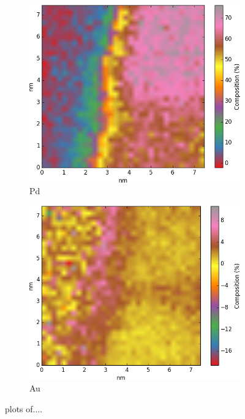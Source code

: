 \begin{figure}
\begin{subfigure}{0.45\textwidth}
		\includegraphics[width=\textwidth]{fig/q/D-E-trim/E_heatedGeKlineHEATMAP/Pd_zeta}
		\caption{Pd}
		\label{fig:Epd}
	\end{subfigure}%
\hfill
	\begin{subfigure}{0.5\textwidth}
		\includegraphics[width=\textwidth]{fig/q/D-E-trim/E_heatedAUHEATMAP/Au_zeta}
		\caption{Au}
		\label{fig:Eau}
	\end{subfigure}
	\caption{plots of....}
	\label{fig:E}
\end{figure}

